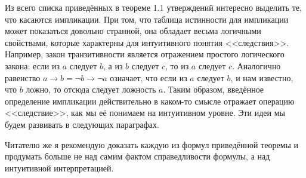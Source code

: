 Из всего списка приведённых в теореме 1.1 утверждений интересно выделить те, что касаются импликации. При том, что таблица истинности для импликации может показаться довольно странной,  она обладает весьма логичными свойствами, которые характерны для интуитивного понятия <<следствия>>. Например, закон транзитивности является отражением простого логического закона: если из $a$ следует $b$, а из $b$ следует $c$, то из $a$ следует $c$. Аналогично равенство $a \rightarrow b = \neg b \rightarrow \neg a$ означает, что если из $a$ следует $b$, и нам известно, что $b$ ложно, то отсюда следует ложность $a$. Таким образом, введённое определение импликации действительно в каком-то смысле отражает операцию <<следствие>>, как мы её понимаем на интуитивном уровне. Эти идеи мы будем развивать в следующих параграфах.

Читателю же я рекомендую доказать каждую из формул приведённой теоремы и продумать больше не над самим фактом справедливости формулы, а над интуитивной интерпретацией.


